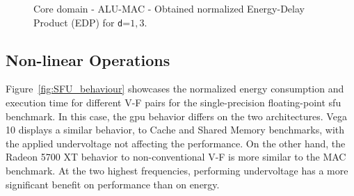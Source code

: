 
\begin{figure}[!htb]
    \centering
    \begin{subfigmatrix}{2}
      \label{fig:MAC_EDP}
    \end{subfigmatrix}
    \caption{Core domain - ALU-MAC - Obtained normalized Energy-Delay Product (EDP) for \texttt{d}=${1,3}$.}
\end{figure}

\newpage
\subsection{Non-linear Operations}

Figure~\ref{fig:SFU_behaviour} showcases the normalized energy consumption and execution time for different V-F pairs for the single-precision floating-point \acrshort{sfu} benchmark. In this case, the \acrshort{gpu} behavior differs on the two architectures. Vega 10 displays a similar behavior, to Cache and Shared Memory benchmarks, with the applied undervoltage not affecting the  performance. On the other hand, the Radeon 5700 XT behavior to non-conventional V-F is more similar to the MAC benchmark. At the two highest frequencies, performing undervoltage has a more significant benefit on performance than on energy.

